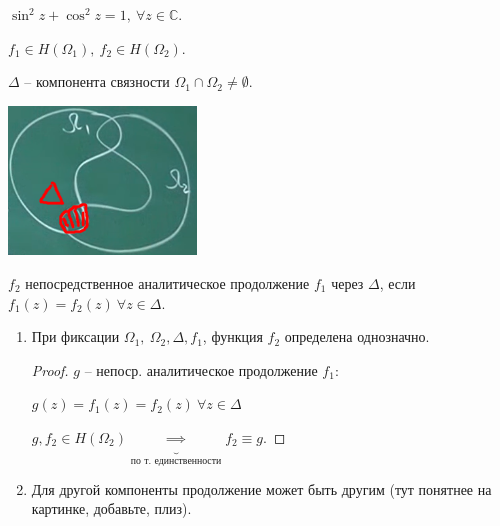 \begin{consequence}
    $\sin^2{z} + \cos^2{z} = 1, \ \forall z \in \mathbb{C}$.
\end{consequence}




\begin{definition}

    $f_1 \in H(\Omega_1), \ f_2 \in H(\Omega_2)$.

    $\Delta$ -- компонента связности $\Omega_1 \cap \Omega_2 \not = \emptyset$.

    \begin{center}
        \includegraphics[width=5cm]{assets/04-functions-of-complex-variables/analitical-extension-difinition.png}
    \end{center}

    $f_2$ непосредственное аналитическое продолжение $f_1$ через $\Delta$, если $f_1(z) = f_2(z) \ \forall z \in \Delta$.
\end{definition}
\begin{remark}
    \begin{enumerate}
        \item {
            При фиксации $\Omega_1, \ \Omega_2, \Delta, f_1$, функция $f_2$ определена однозначно.

            \begin{proof}
                $g$ -- непоср. аналитическое продолжение $f_1$:
            
                $g(z) = f_1(z) = f_2(z) \ \forall z \in \Delta$
            
                $g, f_2 \in H(\Omega_2) \underbrace{\implies}_{\text{по т. единственности}} f_2 \equiv g$.
            \end{proof}            
        }
        \item {
            Для другой компоненты продолжение может быть другим (тут понятнее на картинке, добавьте, плиз).
        }
    \end{enumerate}
\end{remark}

